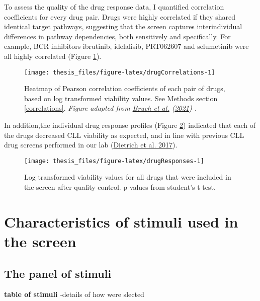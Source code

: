 \documentclass[11pt, a4paper, twosided]{book}
\begin{document}
To assess the quality of the drug response data, I quantified correlation coefficients for every drug pair.
Drugs were highly correlated if they shared identical target pathways, suggesting that the screen captures interindividual differences in pathway dependencies, both sensitively and specifically. For example, BCR inhibitors ibrutinib, idelalisib, PRT062607 and selumetinib were all highly correlated (Figure \ref{fig:drugCorrelations}).


\begin{figure}

{\centering \texttt{[image: thesis\_files/figure-latex/drugCorrelations-1]} 

}

\caption{Heatmap of Pearson correlation coefficients of each pair of drugs, based on log transformed viability values. See Methods section \ref{correlations}. \emph{Figure adapted from \protect\hyperlink{ref-Giles2021}{Bruch et al.} (\protect\hyperlink{ref-Giles2021}{2021}) .}}\label{fig:drugCorrelations}
\end{figure}
In addition,the individual drug response profiles (Figure \ref{fig:drugResponses}) indicated that each of the drugs decreased CLL viability as expected, and in line with previous CLL drug screens performed in our lab (\protect\hyperlink{ref-JCIpaper}{Dietrich et al. 2017}).


\begin{figure}

{\centering \texttt{[image: thesis\_files/figure-latex/drugResponses-1]} 

}

\caption{Log transformed viability values for all drugs that were included in the screen after quality control. p values from student's t test.}\label{fig:drugResponses}
\end{figure}
\hypertarget{stimuli}{%
\section{Characteristics of stimuli used in the screen}\label{stimuli}}

\hypertarget{stimuli-info}{%
\subsection{The panel of stimuli}\label{stimuli-info}}

\textbf{table of stimuli}
-details of how were slected
\end{document}
